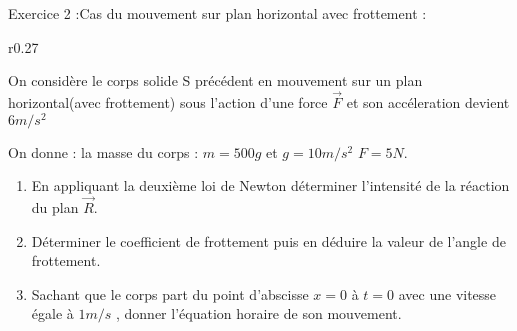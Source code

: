 \documentclass[12pt, french]{article}
\begin{document}
\begin{Box2}{Exercice 2 :Cas du mouvement sur plan horizontal avec frottement : }

	\begin{wrapfigure}[4]{r}{0.27\textwidth}
	\vspace{-0.6cm}
\end{wrapfigure}


On considère le corps solide S précédent en mouvement sur un plan horizontal(avec frottement) sous l'action d'une force $\vec{F}$
et son accéleration devient $6m/s^2$

On donne : la masse du corps : $m=500g$  et $g=10m/s^2$ $F=5N$.
\begin{enumerate}
	\item En appliquant la deuxième loi de Newton déterminer l'intensité de la réaction du plan $\vec{R}$.
	\item Déterminer le coefficient de frottement puis en déduire la valeur de l'angle de frottement.
\item Sachant que le corps part du point d'abscisse $x=0$ à $t=0$ avec une vitesse égale à $1m/s$ , donner l'équation horaire de son mouvement.
\end{enumerate}

\end{Box2}
\end{document}
